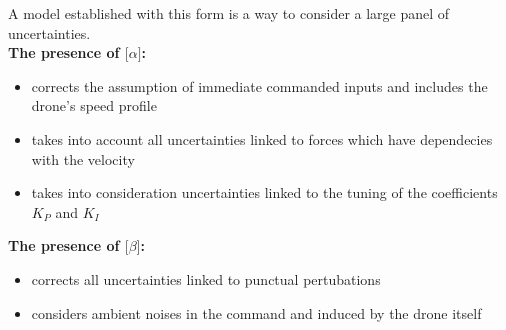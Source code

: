 \documentclass[letterpaper, 10 pt, conference]{ieeeconf}  %
\begin{document}
A model established with this form is a way to consider a large panel of uncertainties.\\
\textbf{The presence of $\lbrack \alpha \rbrack$:}
\begin{itemize}
  \item corrects the assumption of immediate commanded inputs and includes the drone's speed profile\vspace{0.2cm}
  \item  takes into account all uncertainties linked to forces which have dependecies with the velocity\vspace{0.2cm}
  \item takes into consideration uncertainties linked to the tuning of the coefficients $K_{P}$ and $K_{I}$~\cite{PI}
\end{itemize}

\textbf{The presence of $\lbrack \beta \rbrack$:}
\begin{itemize}
  \item corrects all uncertainties linked to punctual pertubations\vspace{0.2cm}
  \item considers ambient noises in the command and induced by the drone itself \vspace{0.2cm}
\end{itemize}
\end{document}
